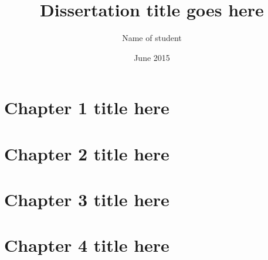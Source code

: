 \documentclass{BGSU}
\title{Dissertation title goes here}
\author{Name of student}
\date{June 2015}
\numberwithin{equation}{chapter}
\begin{document}
\frontmatter

\maketitle

\copyrightpage

\begin{abstract}

\end{abstract}


\begin{acknowledgments}

\end{acknowledgments}

\mbox{}\newpage
\tableofcontents

\listoffigures

\mbox{}\newpage\mbox{}  %
\listoftables

\mainmatter %

\chapter{Chapter 1 title here}


\chapter{Chapter 2 title here}


\chapter{Chapter 3 title here}


\chapter{Chapter 4 title here}

\end{document}
